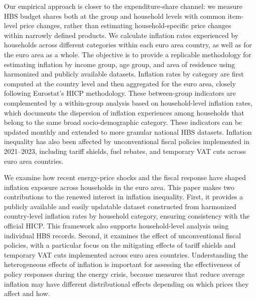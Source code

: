 \documentclass[11pt]{article}
\begin{document}
Our empirical approach is closer to the expenditure-share channel: we measure HBS budget shares both
at the group and household levels with common item-level price changes, rather than estimating
household-specific price changes within narrowly defined products. We calculate inflation rates
experienced by households across different categories within each euro area country, as well as for
the euro area as a whole. The objective is to provide a replicable methodology for estimating
inflation by income group, age group, and area of residence using harmonized and publicly available
datasets. Inflation rates by category are first computed at the country level and then aggregated
for the euro area, closely following Eurostat's HICP methodology. These between-group indicators are
complemented by a within-group analysis based on household-level inflation rates, which documents
the dispersion of inflation experiences among households that belong to the same broad
socio-demographic category. These indicators can be updated monthly and extended to
more granular national HBS datasets. Inflation inequality has also been affected by unconventional
fiscal policies implemented in 2021--2023, including tariff shields, fuel rebates, and temporary VAT
cuts across euro area countries.


We examine how recent energy-price shocks and the fiscal response have shaped inflation 
exposure across households in the euro area. This paper makes two
contributions to the renewed interest in inflation inequality. First, it provides a publicly
available and easily updatable dataset constructed from harmonized country-level inflation rates by
household category, ensuring consistency with the official HICP. This framework also supports household-level analysis using
individual HBS records. Second, it examines the effect of unconventional fiscal
policies, with a particular focus on the mitigating effects of tariff shields and temporary VAT cuts
implemented across euro area countries. Understanding the heterogeneous effects of inflation is
important for assessing the effectiveness of policy responses during the energy crisis, because
measures that reduce average inflation may have different distributional effects depending on which
prices they affect and how.
\end{document}
